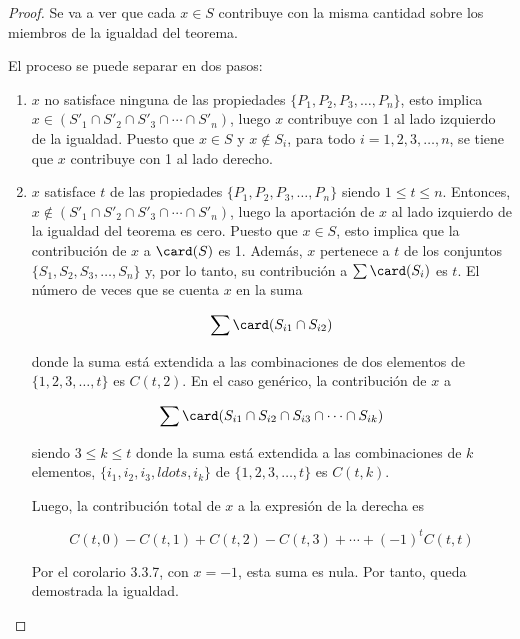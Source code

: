 \begin{proof}
  Se va a ver que cada $x \in S$ contribuye con la misma cantidad sobre los
  miembros de la igualdad del teorema.

  El proceso se puede separar en dos pasos:

  \begin{enumerate}
    \item $x$ no satisface ninguna de las propiedades $\{P_1, P_2, P_3,
    \ldots, P_n\}$, esto implica $x \in (S'_1 \cap S'_2 \cap S'_3 \cap
    \cdots \cap S'_n)$, luego $x$ contribuye con 1 al lado izquierdo de la
    igualdad. Puesto que $x \in S$ y $x \not\in S_i$, para todo $i = 1, 2,
    3, \ldots, n$, se tiene que $x$ contribuye con 1 al lado derecho.

    \item $x$ satisface $t$ de las propiedades $\{P_1, P_2, P_3, \ldots,
    P_n\}$ siendo $1 \leq t \leq n$. Entonces, $x \not\in (S'_1 \cap S'_2
    \cap S'_3 \cap \cdots \cap S'_n)$, luego la aportación de $x$ al lado
    izquierdo de la igualdad del teorema es cero. Puesto que $x \in S$, esto
    implica que la contribución de $x$ a $\card(S)$ es 1. Además, $x$
    pertenece a $t$ de los conjuntos $\{S_1, S_2, S_3, \ldots, S_n\}$ y, por
    lo tanto, su contribución a $\sum \card(S_i)$ es $t$. El número de veces
    que se cuenta $x$ en la suma

    $$ \sum \card(S_{i1} \cap S_{i2}) $$

    \noindent donde la suma está extendida a las combinaciones de dos
    elementos de $\{1, 2, 3, \ldots, t\}$ es $C(t, 2)$. En el caso genérico,
    la contribución de $x$ a

    $$ \sum \card(S_{i1} \cap S_{i2} \cap S_{i3} \cap \cdots \cap S_{ik}) $$

    \noindent siendo $3 \leq k \leq t$ donde la suma está extendida a las
    combinaciones de $k$ elementos, $\{i_1, i_2, i_3, ldots, i_k\}$ de $\{1,
    2, 3, \ldots, t\}$ es $C(t, k)$.

    Luego, la contribución total de $x$ a la expresión de la derecha es

    $$ C(t, 0) - C(t, 1) + C(t, 2) - C(t, 3) + \cdots + ({-1})^t C(t, t) $$

    Por el corolario 3.3.7, con $x = {-1}$, esta suma es nula. Por tanto,
    queda demostrada la igualdad.
  \end{enumerate}














\end{proof}
\fi









